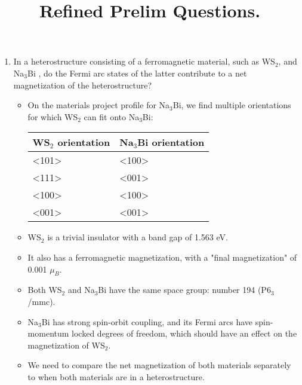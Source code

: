 \documentclass[english]{article}
\begin{document}
\title{Refined Prelim Questions.}
\maketitle


\begin{enumerate}
    \item In a heterostructure consisting of a ferromagnetic material, such as WS$_2$, and Na$_{3}$Bi , do the Fermi arc states of the latter contribute to a net magnetization of the heterostructure?

    \begin{itemize}
        \item On the materials project profile for Na$_{3}$Bi, we find multiple orientations for which WS$_2$ can fit onto Na$_{3}$Bi:
        
            \begin{center}
            \begin{tabular}{ | m{4cm} | m{4cm} | } 
            \hline
            WS$_2$ orientation & Na$_{3}$Bi orientation \\ 
            \hline
            <101> & <100> \\
            \hline
            <111> & <001>\\
            \hline
            <100> & <100>\\
            \hline
            <001> & <001>\\
            \hline
            \end{tabular}
            \end{center}
        
        \item WS$_2$ is a trivial insulator with a band gap of 1.563 eV.  
        
        \item It also has a ferromagnetic magnetization, with a "final magnetization" of 0.001 $\mu_B$. 
        
        \item Both WS$_2$ and Na$_{3}$Bi have the same space group: number 194 (P6$_3$/mmc).  
        
        \item Na$_{3}$Bi has strong spin-orbit coupling, and its Fermi arcs have spin-momentum locked degrees of freedom, which should have an effect on the magnetization of WS$_2$.
        
        \item We need to compare the net magnetization of both materials separately to when both materials are in a heterostructure.  
        

\end{itemize}
\end{enumerate}
\end{document}
